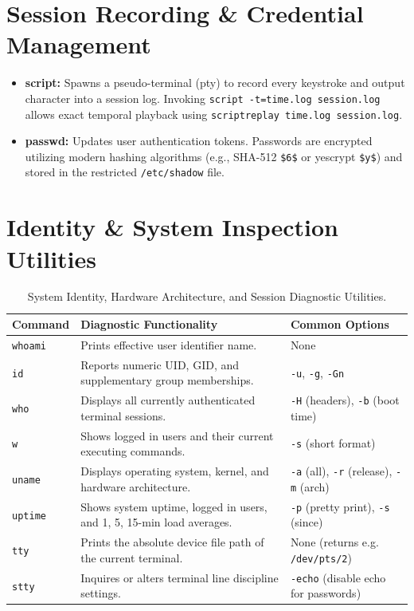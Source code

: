 \section{Session Recording \& Credential Management}
\begin{itemize}[leftmargin=1.5em]
    \item \textbf{script:} Spawns a pseudo-terminal (pty) to record every keystroke and output character into a session log. Invoking \texttt{script -t=time.log session.log} allows exact temporal playback using \texttt{scriptreplay time.log session.log}.
    \item \textbf{passwd:} Updates user authentication tokens. Passwords are encrypted utilizing modern hashing algorithms (e.g., SHA-512 \texttt{\$6\$} or yescrypt \texttt{\$y\$}) and stored in the restricted \texttt{/etc/shadow} file.
\end{itemize}

\section{Identity \& System Inspection Utilities}
\begin{table}[htbp]
\centering
\small
\begin{tabularx}{\linewidth}{l X l}
\toprule
\textbf{Command} & \textbf{Diagnostic Functionality} & \textbf{Common Options} \\
\midrule
\texttt{whoami} & Prints effective user identifier name. & None \\
\texttt{id} & Reports numeric UID, GID, and supplementary group memberships. & \texttt{-u}, \texttt{-g}, \texttt{-Gn} \\
\texttt{who} & Displays all currently authenticated terminal sessions. & \texttt{-H} (headers), \texttt{-b} (boot time) \\
\texttt{w} & Shows logged in users and their current executing commands. & \texttt{-s} (short format) \\
\texttt{uname} & Displays operating system, kernel, and hardware architecture. & \texttt{-a} (all), \texttt{-r} (release), \texttt{-m} (arch) \\
\texttt{uptime} & Shows system uptime, logged in users, and 1, 5, 15-min load averages. & \texttt{-p} (pretty print), \texttt{-s} (since) \\
\texttt{tty} & Prints the absolute device file path of the current terminal. & None (returns e.g. \texttt{/dev/pts/2}) \\
\texttt{stty} & Inquires or alters terminal line discipline settings. & \texttt{-echo} (disable echo for passwords) \\
\bottomrule
\end{tabularx}
\caption{System Identity, Hardware Architecture, and Session Diagnostic Utilities.}
\label{tab:sys-id}
\end{table}


